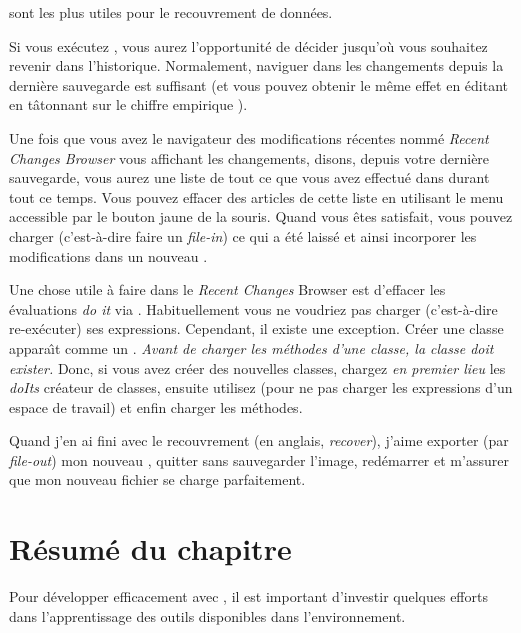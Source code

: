 \documentclass[a4paper,10pt,twoside]{book}
\begin{document}
\noindent
sont les plus utiles pour le recouvrement de donn\'ees.

Si vous ex\'ecutez , vous aurez l'opportunit\'e
de d\'ecider jusqu'o\`u vous souhaitez revenir dans l'historique.
Normalement, naviguer dans les changements depuis la derni\`ere sauvegarde
est suffisant (et vous pouvez obtenir le m\^eme effet en \'editant 
 en t\^atonnant sur le chiffre empirique
).

Une fois que vous avez le navigateur des modifications r\'ecentes nomm\'e
\emph{Recent Changes Browser} vous affichant les changements, disons, depuis votre
derni\`ere sauvegarde, vous aurez une liste de tout ce que vous avez effectu\'e 
dans \pharo durant tout ce temps.
Vous pouvez effacer des articles de cette liste en utilisant le menu accessible
par le {bouton jaune} de la souris. Quand vous \^etes satisfait, vous
pouvez charger (c'est-à-dire faire un \emph{file-in}) ce qui a \'et\'e laiss\'e
et ainsi incorporer les modifications dans un nouveau \changeset.

Une chose utile \`a faire dans le \emph{Recent Changes} Browser est
d'effacer les \'evaluations \emph{do it} via . 
Habituellement vous ne voudriez pas charger (c'est-à-dire re-ex\'ecuter) ses expressions.
Cependant, il existe une exception.
Cr\'eer une classe appara\^{\i}t comme un .
\emph{Avant de charger les m\'ethodes d'une classe, la classe doit exister.}
Donc, si vous avez cr\'eer des nouvelles classes, chargez \emph{en premier lieu} 
les \emph{doIts} cr\'eateur de classes, ensuite utilisez  
(pour ne pas charger les expressions d'un espace de travail)
et enfin charger les m\'ethodes.

Quand j'en ai fini avec le recouvrement (en anglais, \emph{recover}), 
j'aime exporter (par \emph{file-out}) mon nouveau \changeset, quitter \pharo
sans sauvegarder l'image, red\'emarrer et m'assurer que mon nouveau fichier
se charge parfaitement.

\section{R\'esum\'e du chapitre}

Pour d\'evelopper efficacement avec \pharo, il est
important d'investir quelques efforts dans l'apprentissage des outils
disponibles dans l'environnement.
\end{document}

